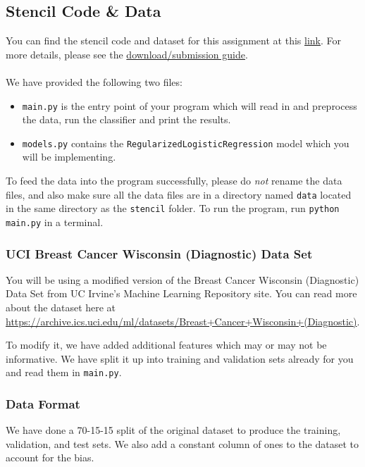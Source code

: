 \documentclass{article}
\begin{document}
\subsection*{Stencil Code \& Data}

You can find the stencil code and dataset for this assignment at this \href{https://drive.google.com/drive/folders/14aCaFkZPvYvyj97DIy5crodD1L6NRZwK?usp=sharing}{link}. For more details, please see the  \href{https://docs.google.com/document/d/1dYim__KVuE9nZj7RBWr9Mw-S6w6EjeFBbSBDxWWWJFA/edit?usp=sharing}{download/submission guide}.
\\ \\
We have provided the following two files:
\begin{itemize}
	\item \texttt{main.py} is the entry point of your program which will read in and preprocess the data, run the classifier and print the results.
	\item \texttt{models.py} contains the \texttt{RegularizedLogisticRegression} model which you will be implementing.
\end{itemize}
To feed the data into the program successfully, please do \textit{not} rename the data files, and also make sure all the data files are in a directory named \texttt{data} located in the same directory as the \texttt{stencil} folder. To run the program, run \texttt{python main.py} in a terminal.

\subsubsection*{UCI Breast Cancer Wisconsin (Diagnostic) Data Set}
You will be using a modified version of the Breast Cancer Wisconsin (Diagnostic) Data Set from UC Irvine's Machine Learning Repository site. You can read more about the dataset here at\\ \url{https://archive.ics.uci.edu/ml/datasets/Breast+Cancer+Wisconsin+(Diagnostic)}. 

To modify it, we have added additional features which may or may not be informative. We have split it up into training and validation sets already for you and read them in \texttt{main.py}.

\subsubsection*{Data Format}

We have done a 70-15-15 split of the original dataset to produce the training, validation, and test sets. We also add a constant column of ones to the dataset to account for the bias.
\end{document}
